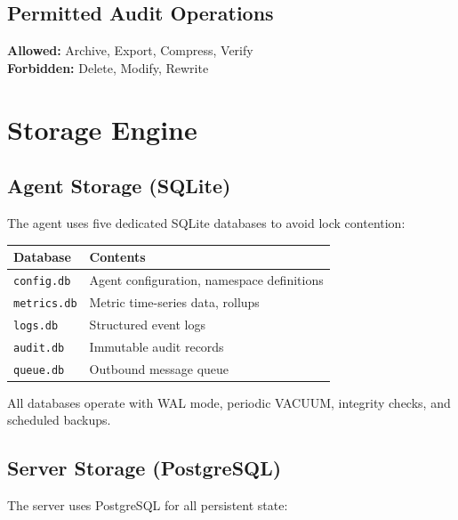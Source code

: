 \documentclass[12pt,a4paper]{article}
\begin{document}
\subsection{Permitted Audit Operations}

\begin{successbox}
\textbf{Allowed:} Archive, Export, Compress, Verify \\
\textbf{Forbidden:} Delete, Modify, Rewrite
\end{successbox}

\section{Storage Engine}

\subsection{Agent Storage (SQLite)}

The agent uses five dedicated SQLite databases to avoid lock contention:

\begin{center}
\begin{tabular}{ll}
\toprule
Database & Contents \\
\midrule
\texttt{config.db}  & Agent configuration, namespace definitions \\
\texttt{metrics.db} & Metric time-series data, rollups \\
\texttt{logs.db}    & Structured event logs \\
\texttt{audit.db}   & Immutable audit records \\
\texttt{queue.db}   & Outbound message queue \\
\bottomrule
\end{tabular}
\end{center}

All databases operate with WAL mode, periodic VACUUM, integrity checks, and scheduled backups.

\subsection{Server Storage (PostgreSQL)}

The server uses PostgreSQL for all persistent state:
\end{document}
